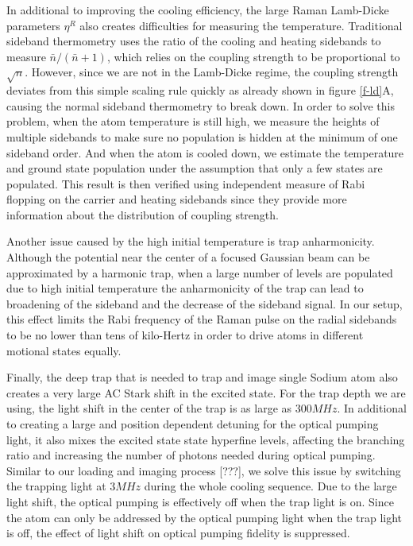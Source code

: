 \documentclass[aps,prl,twocolumn,groupedaddress]{revtex4-1}
\begin{document}
In additional to improving the cooling efficiency, the large Raman Lamb-Dicke parameters $\eta^R$
also creates difficulties for measuring the temperature. Traditional sideband thermometry uses
the ratio of the cooling and heating sidebands to measure $\bar n / (\bar n + 1)$, which relies
on the coupling strength to be proportional to $\sqrt{n}$. However, since we are not in the
Lamb-Dicke regime, the coupling strength deviates from this simple scaling rule quickly as already
shown in figure \ref{f-ld}A, causing the normal sideband thermometry to break down.
In order to solve this problem, when the atom temperature is still high,
we measure the heights of multiple sidebands to make sure no population is hidden at the
minimum of one sideband order. And when the atom is cooled down, we estimate the temperature
and ground state population under the assumption that only a few states are populated.
This result is then verified using independent measure of Rabi flopping on the carrier and heating
sidebands since they provide more information about the distribution of coupling strength.

Another issue caused by the high initial temperature is trap anharmonicity.
Although the potential near the center of a focused Gaussian beam can be approximated
by a harmonic trap, when a large number of levels are populated due to high initial temperature
the anharmonicity of the trap can lead to broadening of the sideband and the decrease of
the sideband signal. In our setup, this effect limits the Rabi frequency of the Raman pulse
on the radial sidebands to be no lower than tens of kilo-Hertz in order to drive atoms in
different motional states equally.

Finally, the deep trap that is needed to trap and image single Sodium atom also creates
a very large AC Stark shift in the excited state. For the trap depth we are using, the
light shift in the center of the trap is as large as $300MHz$.
In additional to creating a large and position dependent detuning for the optical pumping light,
it also mixes the excited state state hyperfine levels,
affecting the branching ratio and increasing the number of photons needed during optical pumping.
Similar to our loading and imaging process [???], we solve this issue by switching the
trapping light at $3MHz$ during the whole cooling sequence.
Due to the large light shift, the optical pumping is effectively off when the trap light is on.
Since the atom can only be addressed by the optical pumping light when the trap light is off,
the effect of light shift on optical pumping fidelity is suppressed.
\end{document}
